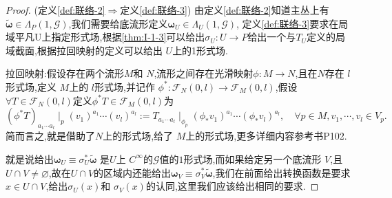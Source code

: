 \documentclass[../main.tex]{subfiles}
\begin{document}
    \begin{proof}
      (定义\ref{def:联络-2}$\Rightarrow$定义\ref{def:联络-3}) 由定义\ref{def:联络-2}知道主丛上有$\bm{\tilde{\omega}}\in \Lambda_P(1, \mathscr{G}) $,我们需要给底流形定义$\bm{\omega}_U \in \Lambda_U(1,\mathscr{G}) $,
      定义\ref{def:联络-3}要求在局域平凡U上指定形式场,根据\ref{thm:I-1-3}可以给出$\sigma_U:U \to P$给出一个与$T_U$定义的局域截面,根据拉回映射的定义可以给出 $U$上的1形式场.
       \begin{note}
       拉回映射:假设存在两个流形$M$和 $N$,流形之间存在光滑映射$\phi:M \to N$,且在$N$存在 $l$形式场,定义 $M$上的 $l$形式场,并记作 $\phi^*:\mathscr{F}_N(0,l) \to \mathscr{F}_M(0,l)$,假设$\forall T \in \mathscr{F}_N(0,l)$定义$\phi^*T \in \mathscr{F}_M(0,l)$为\[
         (\phi^*T)_{a_1 \cdots a_l} \mid _p (v_1)^{a_1} \cdots (v_l)^{a_l} := T_{a_1 \cdots a_l} \mid_{\phi_p}(\phi_* v_1)^{a_1} \cdots (\phi_*v_l)^{a_l}, \quad \forall  p \in M, v_1, \cdots ,v_l \in V_p 
       .\] 简而言之,就是借助了$N$上的形式场,给了 $M$上的形式场,更多详细内容参考书P102.
      \end{note}
      就是说给出$\bm{\omega}_U \equiv \sigma_U^* \bm{\tilde{\omega}}  $ 是$U$上 $C^\infty$的$\mathscr{G}$值的$1$形式场,而如果给定另一个底流形 $V$,且 $U \cap V \neq \varnothing$,故在$U \cap V$的区域内还能给出$\bm{\omega}_V \equiv \sigma^*_V \bm{\tilde{\omega}}$,我们在前面给出转换函数是要求 $x \in U\cap V$,给出$\sigma_U(x)$和 $\sigma_V(x)$的认同,这里我们应该给出相同的要求.


\end{proof}
\end{document}
